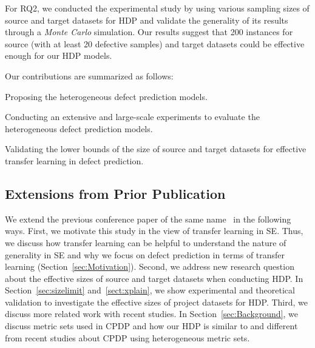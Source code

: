 For RQ2, we conducted the experimental study by using various sampling sizes of source and target datasets for HDP and validate the generality of its results through a {\em Monte Carlo} simulation. Our results suggest that 200 instances for source (with at least 20 defective samples) and target datasets could be effective enough for our HDP models.



Our contributions are summarized as follows:
\squishlist
  \item Proposing the heterogeneous defect prediction models.
  \item Conducting an extensive and large-scale experiments to evaluate
  the heterogeneous defect prediction models.
  \item Validating the lower bounds of the size of source and target datasets for effective transfer learning in defect prediction.
\squishend


\subsection{Extensions from Prior Publication}

We extend the previous conference paper of the same name~\cite{Nam15HDP} in the following ways. First, we motivate this study in the view of transfer learning in SE. Thus, we discuss how transfer learning can be helpful to understand the nature of generality in SE and why we focus on defect prediction in terms of transfer learning (Section~\ref{sec:Motivation}). Second, we address new research question about the effective sizes of source and target datasets when conducting HDP.  In Section~\ref{sec:sizelimit} and~\ref{sect:xplain}, we show experimental and theoretical validation to investigate the effective sizes of project datasets for HDP. Third, we discuss more related work with recent studies. In Section~\ref{sec:Background}, we discuss metric sets used in CPDP and how our HDP is similar to and different from recent studies about CPDP using heterogeneous metric sets.



